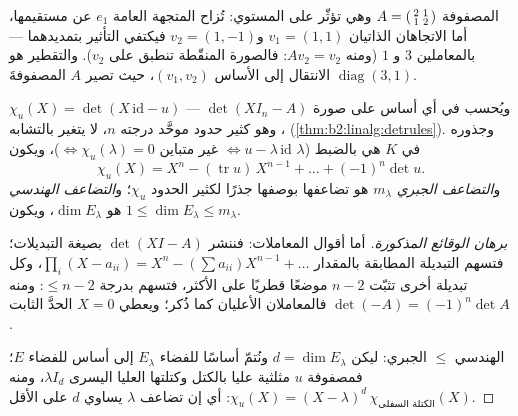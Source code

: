 \begin{omfigure}

{\small المصفوفة $A = \begin{psmallmatrix}2 & 1\\ 1 &
2\end{psmallmatrix}$ وهي تؤثّر على المستوي: تُزاح المتجهة
العامة $e_1$ عن مستقيمها، أما الاتجاهان الذاتيان $v_1 =
(1,1)$ و$v_2 = (1,-1)$ فيكتفي التأثير بتمديدهما --- بالمعاملين $3$ و
$1$ (ومنه $Av_2 = v_2$: فالصورة المنقّطة تنطبق على $v_2$).
والتقطير هو الانتقال إلى الأساس $(v_1, v_2)$، حيث تصير
$A$ المصفوفةَ $\operatorname{diag}(3, 1)$.}
\end{omfigure}

\begin{definition}\label{def:b2:reduction:charpoly}
$\chi_u(X) = \det(X\,\mathrm{id} - u)$ --- ويُحسب في أي أساس على صورة $\det(XI_n - A)$، وهو كثير حدود
موحَّد درجته $n$، لا يتغير بالتشابه
(\cref{thm:b2:linalg:detrules}). وجذوره في $K$ هي بالضبط
 ($\lambda$  $\iff u - \lambda\,\mathrm{id}$
غير متباين $\iff \chi_u(\lambda) = 0$)، ويكون
\[
\chi_u(X) = X^n - (\operatorname{tr} u)\, X^{n-1} + \dots +
(-1)^n \det u .
\]
و\emph{التضاعف الجبري}
$m_\lambda$  هو
تضاعفها بوصفها جذرًا لكثير الحدود $\chi_u$؛ و\emph{التضاعف
الهندسي} هو $\dim E_\lambda$، ويكون $1 \leq \dim E_\lambda \leq
m_\lambda$.
\end{definition}

\begin{proof}[برهان الوقائع المذكورة]
أما أقوال المعاملات: فننشر $\det(XI - A)$ بصيغة
التبديلات؛ فتسهم التبديلة المطابقة بالمقدار $\prod_i (X - a_{ii})
= X^n - (\sum a_{ii})X^{n-1} + \dots$، وكل تبديلة أخرى
تثبّت $n - 2$ موضعًا قطريًا على الأكثر، فتسهم بدرجة $\leq
n - 2$: ومنه فالمعاملان الأعليان كما ذُكر؛ ويعطي $X = 0$
الحدَّ الثابت $\det(-A) = (-1)^n\det A$.

الهندسي $\leq$ الجبري: ليكن $d = \dim E_\lambda$ ونُتمّ أساسًا
للفضاء $E_\lambda$ إلى أساس للفضاء $E$؛ فمصفوفة $u$ مثلثية
عليا بالكتل وكتلتها العليا اليسرى $\lambda I_d$، ومنه $\chi_u(X) =
(X - \lambda)^d\, \chi_{\text{الكتلة السفلى}}(X)$: أي إن تضاعف
$\lambda$ يساوي $d$ على الأقل.
\end{proof}

